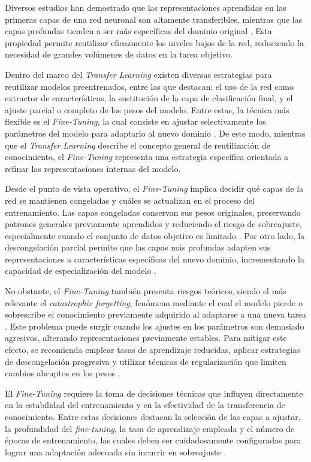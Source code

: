 	Diversos estudios han demostrado que las representaciones aprendidas en las primeras capas de una red neuronal son altamente transferibles, mientras que las capas profundas tienden a ser más específicas del dominio original \cite{yosinski2014}. Esta propiedad permite reutilizar eficazmente los niveles bajos de la red, reduciendo la necesidad de grandes volúmenes de datos en la tarea objetivo.
	
	Dentro del marco del \textit{Transfer Learning} existen diversas estrategias para reutilizar modelos preentrenados, entre las que destacan: el uso de la red como extractor de características, la sustitución de la capa de clasificación final, y el ajuste parcial o completo de los pesos del modelo. Entre estas, la técnica más flexible es el \textit{Fine-Tuning}, la cual consiste en ajustar selectivamente los parámetros del modelo para adaptarlo al nuevo dominio \cite{oquab2014}. De este modo, mientras que el \textit{Transfer Learning} describe el concepto general de reutilización de conocimiento, el \textit{Fine-Tuning} representa una estrategia específica orientada a refinar las representaciones internas del modelo.
	
	Desde el punto de vista operativo, el \textit{Fine-Tuning} implica decidir qué capas de la red se mantienen congeladas y cuáles se actualizan en el proceso del entrenamiento. Las capas congeladas conservan sus pesos originales, preservando patrones generales previamente aprendidos y reduciendo el riesgo de sobreajuste, especialmente cuando el conjunto de datos objetivo es limitado \cite{howard2018}. Por otro lado, la descongelación parcial permite que las capas más profundas adapten sus representaciones a características específicas del nuevo dominio, incrementando la capacidad de especialización del modelo \cite{yosinski2014}.
	
	No obstante, el \textit{Fine-Tuning} también presenta riesgos teóricos, siendo el más relevante el \textit{catastrophic forgetting}, fenómeno mediante el cual el modelo pierde o sobrescribe el conocimiento previamente adquirido al adaptarse a una nueva tarea \cite{french1999}. Este problema puede surgir cuando los ajustes en los parámetros son demasiado agresivos, alterando representaciones previamente estables. Para mitigar este efecto, se recomienda emplear tasas de aprendizaje reducidas, aplicar estrategias de descongelación progresiva y utilizar técnicas de regularización que limiten cambios abruptos en los pesos \cite{howard2018}.
	
	El \textit{Fine-Tuning} requiere la toma de decisiones técnicas que influyen directamente en la estabilidad del entrenamiento y en la efectividad de la transferencia de conocimiento. Entre estas decisiones destacan la selección de las capas a ajustar, la profundidad del \textit{fine-tuning}, la tasa de aprendizaje empleada y el número de épocas de entrenamiento, las cuales deben ser cuidadosamente configuradas para lograr una adaptación adecuada sin incurrir en sobreajuste \cite{yosinski2014}.
	

